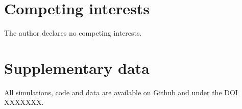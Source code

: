 \documentclass{article}
\begin{document}

\section*{Competing interests} %
\label{sec:competing_interests}

The author declares no competing interests.


\section*{Supplementary data} %
\label{sec:supplementary_data}

All simulations, code and data are available on Github and under the DOI XXXXXXX.



\end{document}
